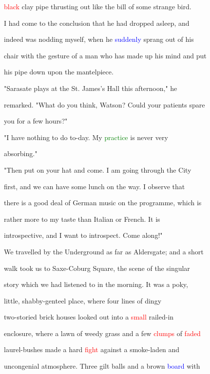  \textcolor{red}{black} clay pipe thrusting out like the bill of some strange bird.

 I had come to the conclusion that he had dropped asleep, and

 indeed was nodding myself, when he \textcolor{blue}{suddenly} sprang out of his

 chair with the gesture of a man who has made up his mind and put

 his pipe down upon the mantelpiece.



 "Sarasate plays at the St. James's Hall this afternoon," he

 remarked. "What do you think, Watson? Could your \textcolor{BurntOrange}{patients} spare

 you for a few hours?"



 "I have nothing to do to-day. My \textcolor{green}{practice} is never very

 absorbing."



 "Then put on your hat and come. I am going through the City

 first, and we can have some lunch on the way. I observe that

 there is a \textcolor{BurntOrange}{good} \textcolor{BurntOrange}{deal} of German \textcolor{BurntOrange}{music} on the programme, which is

 rather more to my taste than Italian or French. It is

 introspective, and I want to introspect. Come along!"



 We travelled by the Underground as far as Aldersgate; and a short

 walk took us to Saxe-Coburg Square, the scene of the singular

 story which we had listened to in the morning. It was a poky,

 little, shabby-genteel place, where four lines of dingy

 two-storied brick houses looked out into a \textcolor{red}{small} railed-in

 enclosure, where a lawn of weedy grass and a few \textcolor{red}{clumps} of \textcolor{red}{faded}

 laurel-bushes made a hard \textcolor{red}{fight} against a smoke-laden and

 uncongenial atmosphere. Three gilt balls and a brown \textcolor{blue}{board} with

